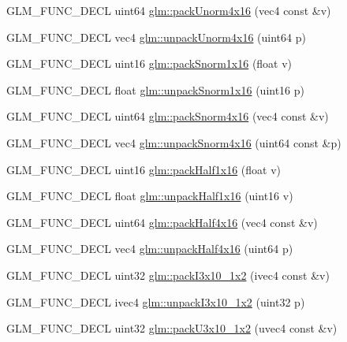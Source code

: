\begin{DoxyCompactItemize}
\item 
G\+L\+M\+\_\+\+F\+U\+N\+C\+\_\+\+D\+E\+CL uint64 \hyperlink{group__gtc__packing_gac561f06c908b7302537a8ef29fcb409e}{glm\+::pack\+Unorm4x16} (vec4 const \&v)
\item 
G\+L\+M\+\_\+\+F\+U\+N\+C\+\_\+\+D\+E\+CL vec4 \hyperlink{group__gtc__packing_gafb2b502bc406031a5618ce930139a9e3}{glm\+::unpack\+Unorm4x16} (uint64 p)
\item 
G\+L\+M\+\_\+\+F\+U\+N\+C\+\_\+\+D\+E\+CL uint16 \hyperlink{group__gtc__packing_gac29411d6c0f6ed0fe9f0396dfe92e0e8}{glm\+::pack\+Snorm1x16} (float v)
\item 
G\+L\+M\+\_\+\+F\+U\+N\+C\+\_\+\+D\+E\+CL float \hyperlink{group__gtc__packing_ga246f451cebf590726324f7a283e3d65e}{glm\+::unpack\+Snorm1x16} (uint16 p)
\item 
G\+L\+M\+\_\+\+F\+U\+N\+C\+\_\+\+D\+E\+CL uint64 \hyperlink{group__gtc__packing_ga9b237d7c66b7a71964e6d1f4dc06539f}{glm\+::pack\+Snorm4x16} (vec4 const \&v)
\item 
G\+L\+M\+\_\+\+F\+U\+N\+C\+\_\+\+D\+E\+CL vec4 \hyperlink{group__gtc__packing_gadb01fc0530f07beb509c89d97b6f4d20}{glm\+::unpack\+Snorm4x16} (uint64 const \&p)
\item 
G\+L\+M\+\_\+\+F\+U\+N\+C\+\_\+\+D\+E\+CL uint16 \hyperlink{group__gtc__packing_gaba534b320836a35372e00af5771dd1a2}{glm\+::pack\+Half1x16} (float v)
\item 
G\+L\+M\+\_\+\+F\+U\+N\+C\+\_\+\+D\+E\+CL float \hyperlink{group__gtc__packing_gaa6eebcdfc746584b7d1823f1d5344fed}{glm\+::unpack\+Half1x16} (uint16 v)
\item 
G\+L\+M\+\_\+\+F\+U\+N\+C\+\_\+\+D\+E\+CL uint64 \hyperlink{group__gtc__packing_ga8104f0b719b7792491f2b789a6dd6f96}{glm\+::pack\+Half4x16} (vec4 const \&v)
\item 
G\+L\+M\+\_\+\+F\+U\+N\+C\+\_\+\+D\+E\+CL vec4 \hyperlink{group__gtc__packing_gaea526d6491ad40401eac34803984bf27}{glm\+::unpack\+Half4x16} (uint64 p)
\item 
G\+L\+M\+\_\+\+F\+U\+N\+C\+\_\+\+D\+E\+CL uint32 \hyperlink{group__gtc__packing_ga032e18fa5bc5b8f3897104aeb2f1e195}{glm\+::pack\+I3x10\+\_\+1x2} (ivec4 const \&v)
\item 
G\+L\+M\+\_\+\+F\+U\+N\+C\+\_\+\+D\+E\+CL ivec4 \hyperlink{group__gtc__packing_ga08bcd34cf9c34701d658dd861ee6e300}{glm\+::unpack\+I3x10\+\_\+1x2} (uint32 p)
\item 
G\+L\+M\+\_\+\+F\+U\+N\+C\+\_\+\+D\+E\+CL uint32 \hyperlink{group__gtc__packing_gaf656d8862628f96b20de7a36eaa1fe56}{glm\+::pack\+U3x10\+\_\+1x2} (uvec4 const \&v)

\end{DoxyCompactItemize}

